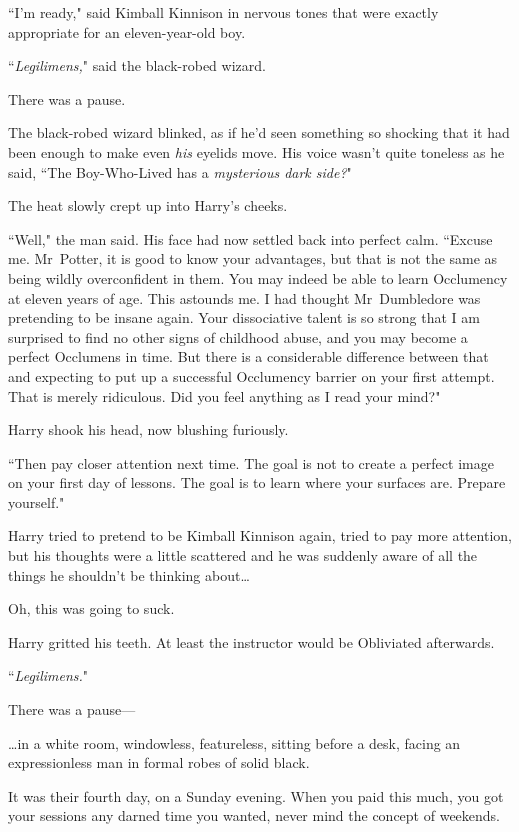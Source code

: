 ``I'm ready," said Kimball Kinnison in nervous tones that were exactly appropriate for an eleven-year-old boy.

``\emph{Legilimens,}" said the black-robed wizard.

There was a pause.

The black-robed wizard blinked, as if he'd seen something so shocking that it had been enough to make even \emph{his} eyelids move. His voice wasn't quite toneless as he said, ``The Boy-Who-Lived has a \emph{mysterious dark side?}"

The heat slowly crept up into Harry's cheeks.

``Well," the man said. His face had now settled back into perfect calm. ``Excuse me. Mr~Potter, it is good to know your advantages, but that is not the same as being wildly overconfident in them. You may indeed be able to learn Occlumency at eleven years of age. This astounds me. I had thought Mr~Dumbledore was pretending to be insane again. Your dissociative talent is so strong that I am surprised to find no other signs of childhood abuse, and you may become a perfect Occlumens in time. But there is a considerable difference between that and expecting to put up a successful Occlumency barrier on your first attempt. That is merely ridiculous. Did you feel anything as I read your mind?"

Harry shook his head, now blushing furiously.

``Then pay closer attention next time. The goal is not to create a perfect image on your first day of lessons. The goal is to learn where your surfaces are. Prepare yourself."

Harry tried to pretend to be Kimball Kinnison again, tried to pay more attention, but his thoughts were a little scattered and he was suddenly aware of all the things he shouldn't be thinking about{\ldots}

Oh, this was going to suck.

Harry gritted his teeth. At least the instructor would be Obliviated afterwards.

``\emph{Legilimens.}"

There was a pause—

\later

{\ldots}in a white room, windowless, featureless, sitting before a desk, facing an expressionless man in formal robes of solid black.

It was their fourth day, on a Sunday evening. When you paid this much, you got your sessions any darned time you wanted, never mind the concept of weekends.

